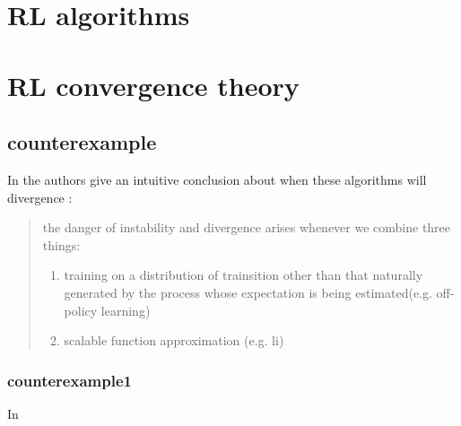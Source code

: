 \documentclass{article}
\theoremstyle{definition}
\theoremstyle{remark}
\begin{document}
	
	
	
	\section{RL algorithms}
	\label{algorithms}
	
	\section{RL convergence theory}
	\label{convergence}
	
	\subsection{counterexample}
	
	In \cite[chap 11.3]{sutton2011reinforcement} the authors give  an intuitive conclusion about when these algorithms will divergence :
	\begin{quotation}
		the danger of instability and divergence arises whenever we combine  three things:
		\begin{enumerate}
			\item training on a distribution of trainsition other than that naturally generated by the process whose expectation is being estimated(e.g. off-policy learning)
			\item scalable function approximation (e.g. li)
		\end{enumerate}
		
	\end{quotation}
	
	\subsubsection{counterexample1}
	In \cite{bertsekas1995counterexample} 

		
		
	
	
\end{document}
